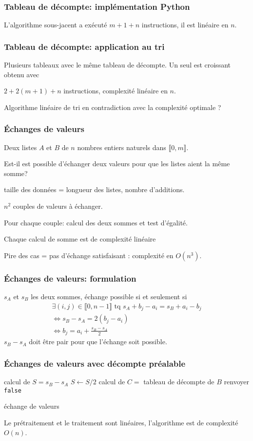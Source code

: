 \begin{frame}
  \frametitle{Tableau de décompte: implémentation Python}

L'algorithme sous-jacent a exécuté $m+1+n$ instructions, il est linéaire en $n$.
\end{frame}

\begin{frame}
  \frametitle{Tableau de décompte: application au tri}
Plusieurs tableaux avec le même tableau de décompte. Un seul est croissant obtenu avec

$2+2(m+1)+n$ instructions, complexité linéaire en $n$.

Algorithme linéaire de tri en contradiction avec la complexité optimale ?
\end{frame}

\begin{frame}
  \frametitle{\'Echanges de valeurs}
Deux listes $A$ et $B$ de $n$ nombres entiers naturels dans $\llbracket 0,m\rrbracket$.

Est-il est possible d'échanger deux valeurs pour que les listes aient la même somme? 

taille des données = longueur des listes, nombre d'additions.

$n^2$ couples de valeurs à échanger. 

Pour chaque couple: calcul des deux sommes et test d'égalité.

Chaque calcul de somme est de complexité linéaire

Pire des cas = pas d'échange satisfaisant : complexité en $O(n^3)$.
\end{frame}

\begin{frame}
  \frametitle{\'Echanges de valeurs: formulation}
$s_A$ et $s_B$ les deux sommes, échange possible si et seulement si 
\begin{multline*}
  \exists (i,j)\in \llbracket 0, n-1 \rrbracket \text{ tq } s_A + b_j -a_i = s_B + a_i - b_j\\
  \Leftrightarrow s_B - s_A = 2(b_j - a_i)\\
\Leftrightarrow b_j = a_i + \frac{s_B - s_A}{2}
\end{multline*}
$s_B - s_A$ doit être pair pour que l'échange soit possible.
\end{frame}

\begin{frame}
  \frametitle{\'Echanges de valeurs avec décompte préalable}
\begin{algorithm}[H]
  calcul de $S = s_B - s_A$\;
  $S \leftarrow S/2$\;
  calcul de $C=$ tableau de décompte de $B$\;
  renvoyer \texttt{false}\;
  \caption{échange de valeurs}
  \label{complexite_3}
\end{algorithm}
Le prétraitement et le traitement sont linéaires, l'algorithme est de complexité $O(n)$.
\end{frame}

